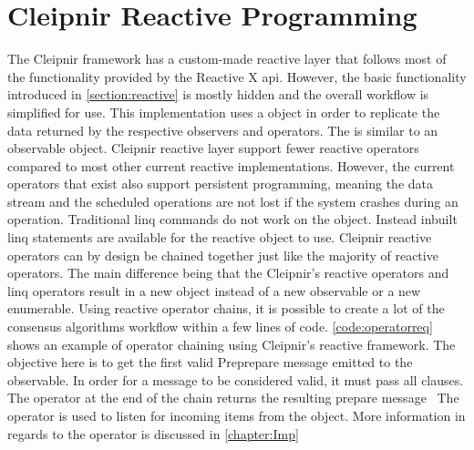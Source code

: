 \section{Cleipnir Reactive Programming}
The Cleipnir framework has a custom-made reactive layer that follows most of the functionality provided by the Reactive X \ac{api}. However, the basic functionality introduced in \autoref{section:reactive} is mostly hidden and the overall workflow is simplified for use. This implementation uses a  object in order to replicate the data returned by the respective observers and operators. The  is similar to an observable object.
Cleipnir reactive layer support fewer reactive operators compared to most other current reactive implementations. However, the current operators that exist also support persistent programming, meaning the data stream and the scheduled operations are not lost if the system crashes during an operation. Traditional \ac{linq} commands do not work on the  object. Instead inbuilt \ac{linq} statements are available for the reactive  object to use. Cleipnir reactive operators can by design be chained together just like the majority of reactive operators. The main difference being that the Cleipnir’s reactive operators and \ac{linq} operators result in a new  object instead of a new observable or a new enumerable. Using reactive operator chains, it is possible to create a lot of the consensus algorithms workflow within a few lines of code. \autoref{code:operatorreq} shows an example of operator chaining using Cleipnir’s reactive framework. The objective here is to get the first valid Preprepare message emitted to the observable. In order for a message to be considered valid, it must pass all  clauses. The  operator at the end of the chain returns the resulting prepare message~\cites[p.~6,8,13]{PAPER:PaxosCleipnir, WEB:ReactiveOperator} The  operator is used to listen for incoming items from the   object. More information in regards to the  operator is discussed in \autoref{chapter:Imp}


